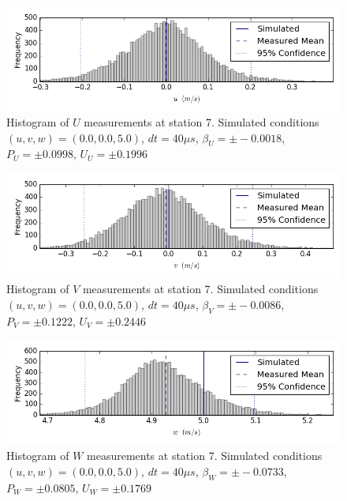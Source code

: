 \begin{figure}[H]
\centering
\includegraphics[width=6in]{figs/Ely_May28th07001/uncertainty_Ely_May28th07001_U}
\caption{Histogram of $U$ measurements at station 7. Simulated conditions $(u,v,w)=(0.0, 0.0, 5.0)$, $dt=40 \mu s$, $\beta_U=\pm -0.0018$, $P_U=\pm 0.0998$, $U_U=\pm 0.1996$}
\label{fig:uncertainty_Ely_May28th07001_U}
\end{figure}


\begin{figure}[H]
\centering
\includegraphics[width=6in]{figs/Ely_May28th07001/uncertainty_Ely_May28th07001_V}
\caption{Histogram of $V$ measurements at station 7. Simulated conditions $(u,v,w)=(0.0, 0.0, 5.0)$, $dt=40 \mu s$, $\beta_V=\pm -0.0086$, $P_V=\pm 0.1222$, $U_V=\pm 0.2446$}
\label{fig:uncertainty_Ely_May28th07001_V}
\end{figure}


\begin{figure}[H]
\centering
\includegraphics[width=6in]{figs/Ely_May28th07001/uncertainty_Ely_May28th07001_W}
\caption{Histogram of $W$ measurements at station 7. Simulated conditions $(u,v,w)=(0.0, 0.0, 5.0)$, $dt=40 \mu s$, $\beta_W=\pm -0.0733$, $P_W=\pm 0.0805$, $U_W=\pm 0.1769$}
\label{fig:uncertainty_Ely_May28th07001_W}
\end{figure}


